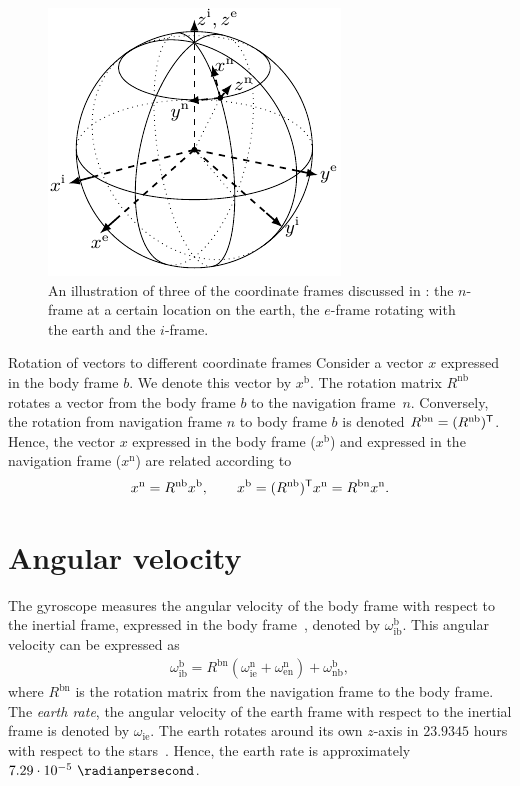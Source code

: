 \begin{figure}
	\centering
    	\includegraphics[scale = 1]{figure2_1.pdf}
    	\caption{An illustration of three of the coordinate frames discussed in : the $n$-frame at a certain location on the earth, the $e$-frame rotating with the earth
      		and the $i$-frame.}
	\label{fig:sensors-coordinateFrames}
\end{figure}

\begin{myexample}{Rotation of vectors to different coordinate frames}%
\label{ex:sensors-rotationVectors}%
Consider a vector $x$ expressed in the body frame $b$. We denote this vector by $x^\text{b}$. The rotation matrix $R^\text{nb}$ rotates a vector from the body frame $b$ to the navigation frame~$n$. Conversely, the rotation from navigation frame $n$ to body frame $b$ is denoted $R^\text{bn} = ( R^{\text{nb}} )^{\mathsf{T}}$. Hence, the vector $x$ expressed in the body frame ($x^\text{b}$) and expressed in the navigation frame ($x^\text{n}$) are related according to
\begin{align}
x^\text{n} = R^{\text{nb}} x^\text{b}, \qquad x^\text{b} = ( R^{\text{nb}} )^{\mathsf{T}} x^\text{n} = R^{\text{bn}} x^\text{n}.
\end{align}%
\vspace*{-\baselineskip}
\end{myexample}

\section{Angular velocity}
\label{sec:sensors-angVel}
The gyroscope measures the angular velocity of the body frame with respect to the inertial frame, expressed in the body frame~\citep{tittertonW:1997}, denoted by $\omega_{\text{ib}}^\text{b}$. This angular velocity can be expressed as
\begin{align}
\label{eq:sen-imu-gyr-n}
\omega_{\text{ib}}^\text{b}
= R^{\text{bn}} \left(
\omega_{\text{ie}}^\text{n} +
\omega_{\text{en}}^\text{n} \right)
+ \omega_{\text{nb}}^\text{b},
\end{align}
where $R^{\text{bn}}$ is the rotation matrix from the navigation frame to the body frame. The \emph{earth rate}, \ie the angular velocity of the earth frame with respect to the inertial frame is denoted by $\omega_{\text{ie}}$. The earth rotates around its own $z$-axis in $23.9345$ hours with respect to the stars~\citep{nasa:2016}. Hence, the earth rate is approximately $7.29 \cdot 10^{-5}~\radianpersecond$.

